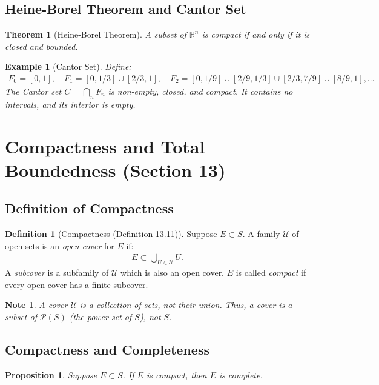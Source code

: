 \documentclass[9pt]{article}
\theoremstyle{definition}
\newtheorem{definition}{Definition}
\theoremstyle{plain}
\newtheorem{theorem}{Theorem}
\newtheorem{proposition}{Proposition}
\newtheorem{example}{Example}
\newtheorem{note}{Note}
\begin{document}
\subsection*{Heine-Borel Theorem and Cantor Set}
\begin{theorem}[Heine-Borel Theorem]
A subset of $ \mathbb{R}^n $ is compact if and only if it is closed and bounded.
\end{theorem}

\begin{example}[Cantor Set]
Define:
\begin{align}
F_0 = [0, 1], \quad F_1 = [0, 1/3] \cup [2/3, 1], \quad F_2 = [0, 1/9] \cup [2/9, 1/3] \cup [2/3, 7/9] \cup [8/9, 1], \dots
\end{align}
The Cantor set $ C = \bigcap_n F_n $ is non-empty, closed, and compact. It contains no intervals, and its interior is empty.
\end{example}
\section*{Compactness and Total Boundedness (Section 13)}

\subsection*{Definition of Compactness}
\begin{definition}[Compactness (Definition 13.11)]
Suppose $ E \subset S $. A family $ \mathcal{U} $ of open sets is an \textit{open cover} for $ E $ if:
\begin{align}
E \subset \bigcup_{U \in \mathcal{U}} U.
\end{align}
A \textit{subcover} is a subfamily of $ \mathcal{U} $ which is also an open cover. $ E $ is called \textit{compact} if every open cover has a finite subcover.
\end{definition}

\begin{note}
A cover $ \mathcal{U} $ is a collection of sets, not their union. Thus, a cover is a subset of $ \mathcal{P}(S) $ (the power set of $ S $), not $ S $.
\end{note}

\subsection*{Compactness and Completeness}
\begin{proposition}
Suppose $ E \subset S $. If $ E $ is compact, then $ E $ is complete.
\end{proposition}
\end{document}
